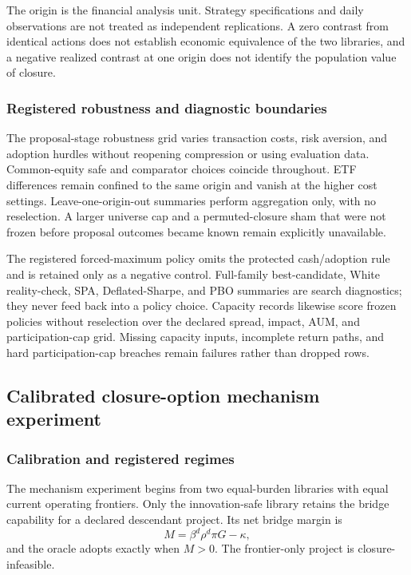 The origin is the financial analysis unit. Strategy specifications and daily
observations are not treated as independent replications. A zero contrast from
identical actions does not establish economic equivalence of the two libraries,
and a negative realized contrast at one origin does not identify the population
value of closure.

\subsubsection{Registered robustness and diagnostic boundaries}

The proposal-stage robustness grid varies transaction costs, risk aversion,
and adoption hurdles without reopening compression or using evaluation data.
Common-equity safe and comparator choices coincide throughout. ETF differences
remain confined to the same origin and vanish at the higher cost settings.
Leave-one-origin-out summaries perform aggregation only, with no reselection.
A larger universe cap and a permuted-closure sham that were not frozen before
proposal outcomes became known remain explicitly unavailable.

The registered forced-maximum policy omits the protected cash/adoption rule and
is retained only as a negative control. Full-family best-candidate, White
reality-check, SPA, Deflated-Sharpe, and PBO summaries are search diagnostics;
they never feed back into a policy choice. Capacity records likewise score
frozen policies without reselection over the declared spread, impact, AUM, and
participation-cap grid. Missing capacity inputs, incomplete return paths, and
hard participation-cap breaches remain failures rather than dropped rows.

\subsection{Calibrated closure-option mechanism experiment}

\subsubsection{Calibration and registered regimes}

The mechanism experiment begins from two equal-burden libraries with equal
current operating frontiers. Only the innovation-safe library retains the
bridge capability for a declared descendant project. Its net bridge margin is
\[
M=\beta^d\rho^d\pi G-\kappa,
\]
and the oracle adopts exactly when \(M>0\). The frontier-only project is
closure-infeasible.

